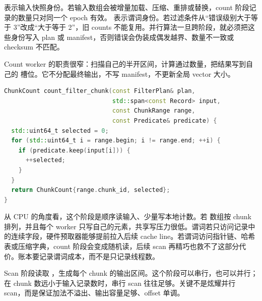  表示输入快照身份。若输入数组会被增量加载、压缩、重排或替换，count 阶段记录的数量只对同一个 epoch 有效。 表示谓词身份。若过滤条件从“错误级别大于等于 3”改成“大于等于 2”，旧 counts 不能复用。并行算法一旦跨阶段，就必须把这些身份写入 plan 或 manifest，否则错误会伪装成偶发越界、数量不一致或 checksum 不匹配。

Count worker 的职责很窄：扫描自己的半开区间，计算通过数量，把结果写到自己的  槽位。它不分配最终输出，不写 manifest，不更新全局 vector 大小。

\begin{lstlisting}[language=C++,caption={stable filter count 阶段伪代码}]
ChunkCount count_filter_chunk(const FilterPlan& plan,
                              std::span<const Record> input,
                              const ChunkRange range,
                              const Predicate& predicate) {
  std::uint64_t selected = 0;
  for (std::uint64_t i = range.begin; i != range.end; ++i) {
    if (predicate.keep(input[i])) {
      ++selected;
    }
  }
  return ChunkCount{range.chunk_id, selected};
}
\end{lstlisting}

从 CPU 的角度看，这个阶段是顺序读输入、少量写本地计数。若  数组按 chunk 排列，并且每个 worker 只写自己的元素，共享写压力很低。谓词若只访问记录中的连续字段，硬件预取器能够提前拉入后续 cache line。若谓词访问指针链、哈希表或压缩字典，count 阶段会变成随机读，后续 scan 再精巧也救不了这部分代价。账本要记录谓词成本，而不是只记录线程数。

Scan 阶段读取 ，生成每个 chunk 的输出区间。这个阶段可以串行，也可以并行；在 chunk 数远小于输入记录数时，串行 scan 往往足够。关键不是炫耀并行 scan，而是保证加法不溢出、输出容量足够、offset 单调。

